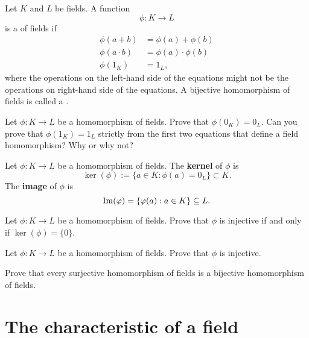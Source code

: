 \documentclass{ximera}
\begin{document}
\begin{definition}
  Let $K$ and $L$ be fields. A function
  \[
  \phi:K\to L
  \]
  is a  of fields if
  \begin{align*}
    \phi(a+b) &= \phi(a)+\phi(b)\\
    \phi(a\cdot b) &= \phi(a)\cdot \phi(b)\\
    \phi(1_K) &= 1_L,
  \end{align*}
  where the operations on the left-hand side of the equations might
  not be the operations on right-hand side of the equations. A
  bijective homomorphism of fields is called a .
\end{definition}

\begin{exercise}
  Let $\phi:K\to L$ be a homomorphism of fields. Prove that $\phi(0_K)
  = 0_L$. Can you prove that $\phi(1_K) = 1_L$ strictly from the first
  two equations that define a field homomorphism? Why or why not?
\end{exercise}


\begin{definition}
  Let $\phi: K\to L$ be a homomorphism of fields. The \textbf{kernel}
  of $\phi$ is
  \[
  \ker(\phi) := \{a\in K:\phi(a) = 0_L\}\subset K.
  \]
  The \textbf{image} of $\phi$ is
  \[
  \operatorname{Im}(\varphi) = \{\varphi(a):a\in K\}\subseteq L.
  \]
\end{definition}


\begin{exercise}
  Let $\phi:K\to L$ be a homomorphism of fields. Prove that $\phi$ is
  injective if and only if $\ker(\phi) = \{0\}$.
\end{exercise}

\begin{exercise}
  Let $\phi:K\to L$ be a homomorphism of fields. Prove that $\phi$ is
  injective.
\end{exercise}

\begin{exercise}
  Prove that every surjective homomorphism of fields is a bijective
  homomorphism of fields.
\end{exercise}







\section{The characteristic of a field}
\end{document}
